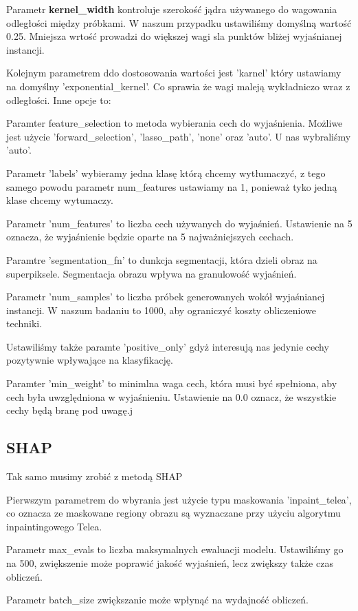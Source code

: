 Parametr \textbf{kernel\_width} kontroluje szerokość jądra używanego do wagowania odległości między próbkami. W naszum przypadku ustawiliśmy domyślną wartość 0.25.
Mniejsza wrtość prowadzi do większej wagi sla punktów bliżej wyjaśnianej instancji.

Kolejnym parametrem ddo dostosowania wartości jest 'karnel' który ustawiamy na domyślny 'exponential\_kernel'.
Co sprawia że wagi maleją wykładniczo wraz z odległości.
Inne opcje to: 

Paramter feature\_selection to metoda wybierania cech do wyjaśnienia. Możliwe jest użycie 'forward\_selection', 'lasso\_path', 'none' oraz 'auto'. U nas wybraliśmy 'auto'. 

Parametr 'labels' wybieramy jedna klasę którą chcemy wytłumaczyć, z tego samego powodu parametr num\_features ustawiamy na 1, ponieważ tyko jedną klase chcemy wytumaczy.

Parametr 'num\_features' to liczba cech używanych do wyjaśnień.
Ustawienie na 5 oznacza, że wyjaśnienie będzie oparte na 5 najważniejszych cechach.

Paramtre 'segmentation\_fn' to dunkcja segmentacji, która dzieli obraz na superpiksele.
Segmentacja obrazu wpływa na granulowość wyjaśnień.

Parametr 'num\_samples' to liczba próbek generowanych wokół wyjaśnianej instancji.
W naszum badaniu to 1000, aby ograniczyć koszty obliczeniowe techniki.

Ustawiliśmy także paramte 'positive\_only' gdyż interesują nas jedynie cechy pozytywnie wpływające na klasyfikację.

Paramter 'min\_weight' to minimlna waga cech, która musi być spełniona, aby cech była uwzględniona w wyjaśnieniu.
Ustawienie na 0.0 oznacz, że wszystkie cechy będą branę pod uwagę.j

\subsection*{SHAP}
Tak samo musimy zrobić z metodą SHAP

Pierwszym parametrem do wbyrania jest użycie typu maskowania 'inpaint\_telea', co oznacza ze maskowane regiony obrazu są wyznaczane przy użyciu algorytmu inpaintingowego Telea.

Parametr max\_evals to liczba maksymalnych ewaluacji modelu.
Ustawiliśmy go na 500, zwiększenie może poprawić jakość wyjaśnień, lecz zwiększy także czas obliczeń.

Parametr batch\_size zwiększanie może wpłynąć na wydajność obliczeń.

